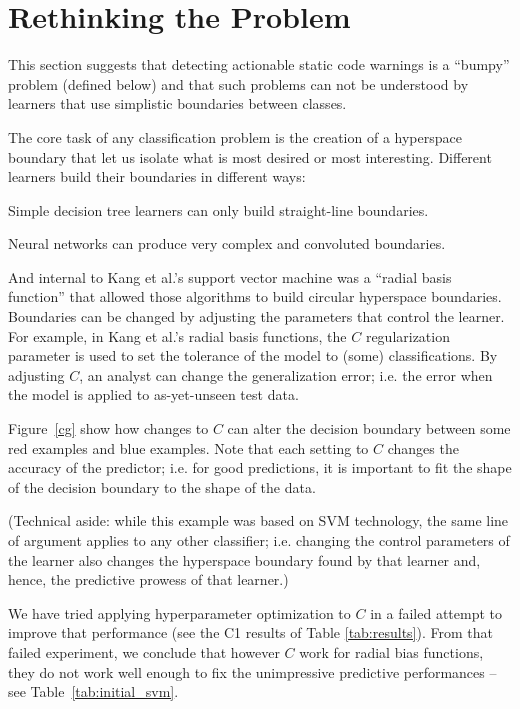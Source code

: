 

 
\section{Rethinking the Problem}\label{problem}

This section suggests that detecting actionable static code warnings is a ``bumpy'' problem
(defined below) and that such problems can not be understood by learners that use simplistic
boundaries between classes.  

The core task of any classification problem is the creation of a hyperspace
boundary that let us isolate what is most desired or most interesting. Different learners build their boundaries in different ways:
\bi
\item Simple decision tree learners can only build straight-line
boundaries. 
\item Neural networks can produce very complex and convoluted boundaries.
\item And
internal to   
Kang et al.'s support vector machine was a ``radial basis function''
that allowed those algorithms to build circular hyperspace
boundaries.  
\ei 
Boundaries can be changed by adjusting
the
parameters that control the learner. For example, in Kang et al.'s radial basis functions,
the $C$ regularization parameter is used to set the tolerance of the model to (some) classifications. By adjusting $C$, an analyst can change
the generalization error; i.e. the error when the model is applied to as-yet-unseen test data.

Figure~\ref{cg} show how changes to $C$ can alter the decision
boundary between some red examples and blue examples. Note that each
setting to $C$ changes the accuracy of the predictor; i.e.
for good predictions, it is important to fit the shape of the decision boundary to the shape of the data. 

(Technical aside: while this example was based on SVM technology, the same line of argument applies to  any other classifier; i.e. changing
the control parameters of the learner also changes the hyperspace boundary 
found by that learner and, hence, the predictive prowess of that learner.)

We have tried applying    hyperparameter optimization to   $C$ in a failed attempt to improve that performance (see the C1 results of Table \ref{tab:results}). 
From that failed experiment, we conclude that   however  $C$ work
for radial bias functions, they do not work well enough to fix
the unimpressive predictive performances -- see Table~\ref{tab:initial_svm}.


